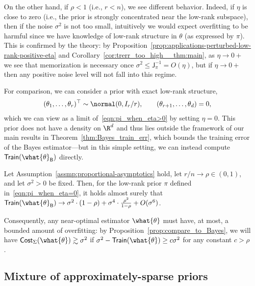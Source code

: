 \documentclass[11pt]{article}
\newcommand{\bysest}{\what{\theta}_{\mathsf{B}}}
\newcommand{\trerr}{\mathsf{Train}}
\newcommand{\cost}{\mathsf{Cost}}
\newcommand{\jfunc}{\mathsf{J}}
\begin{document}
On the other hand, if $\rho<1$ (i.e., $r<n$), we see different behavior. Indeed, if $\eta$ is close to zero (i.e., the prior is strongly concentrated near the low-rank subspace), then if the noise $\sigma^2$ is not too small, intuitively we would expect overfitting to be harmful since we have knowledge of low-rank structure in $\theta$ (as expressed by $\pi$).
This is confirmed by the theory: by Proposition~\ref{prop:applications-perturbed-low-rank-positive-eta} and Corollary~\ref{cor:trerr_too_high__thm:main}, as $\eta\to0+$ we see that memorization is necessary once $\sigma^2\leq \jfunc_\pi^{-1} = O(\eta)$, but if $\eta\to0+$ then any positive noise level will not fall into this regime. 

For comparison, we can consider a prior with exact low-rank structure,
\begin{equation}\label{eqn:pi_when_eta=0}(\theta_1,\dots,\theta_r)^\top \sim \normal(0,I_r/r), \qquad (\theta_{r+1},\dots,\theta_d)=0,\end{equation}
which we can view as a limit of~\eqref{eqn:pi_when_eta>0} by setting $\eta=0$.
This prior does not have a density on $\R^d$ and thus lies outside the framework of our main results in Theorem~\ref{thm:Bayes_train_err}, which bounds the training error of the Bayes estimator---but in this simple setting, we can instead compute $\trerr(\bysest)$ directly.

\begin{proposition} \label{prop:applications-perturbed-low-rank-zero-eta} Let Assumption~\ref{assmp:proportional-asymptotics} hold, let $r/n \to \rho \in (0, 1)$, and let $\sigma^2>0$ be fixed. Then, for the low-rank prior $\pi$ defined in~\eqref{eqn:pi_when_eta=0}, it holds almost surely that
$\trerr(\bysest) \to \sigma^2 \cdot (1-\rho) +\sigma^4 \cdot \frac{\rho^2}{1-\rho}  + O(\sigma^6)$.
\end{proposition}
Consequently, any near-optimal estimator $\what{\theta}$ must have, at most, a bounded amount of overfitting: by Proposition~\ref{prop:compare_to_Bayes}, we will have $\cost_\Sigma(\what{\theta})\gtrsim \sigma^2$ if $\sigma^2 - \trerr(\what{\theta}) \geq c\sigma^2$ for any constant $c>\rho$.


\subsection{Mixture of approximately-sparse priors}\label{sec:example_3}
\end{document}
